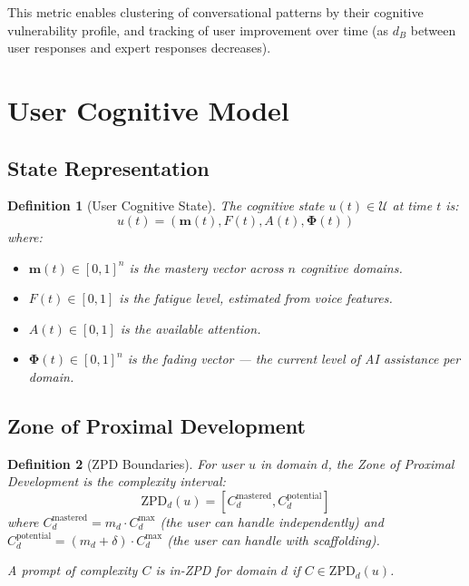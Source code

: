 \documentclass[12pt,a4paper]{article}
\newtheorem{definition}{Definition}[section]
\theoremstyle{remark}
\newcommand{\CU}{\mathcal{U}}
\begin{document}
This metric enables clustering of conversational patterns by their cognitive vulnerability profile, and tracking of user improvement over time (as $d_B$ between user responses and expert responses decreases).

\section{User Cognitive Model}

\subsection{State Representation}

\begin{definition}[User Cognitive State]
The cognitive state $u(t) \in \CU$ at time $t$ is:
\begin{equation}
u(t) = (\mathbf{m}(t), F(t), A(t), \mathbf{\Phi}(t))
\end{equation}
where:
\begin{itemize}
    \item $\mathbf{m}(t) \in [0,1]^n$ is the \emph{mastery vector} across $n$ cognitive domains.
    \item $F(t) \in [0,1]$ is the \emph{fatigue level}, estimated from voice features.
    \item $A(t) \in [0,1]$ is the \emph{available attention}.
    \item $\mathbf{\Phi}(t) \in [0,1]^n$ is the \emph{fading vector} — the current level of AI assistance per domain.
\end{itemize}
\end{definition}

\subsection{Zone of Proximal Development}

\begin{definition}[ZPD Boundaries]
For user $u$ in domain $d$, the Zone of Proximal Development is the complexity interval:
\begin{equation}
\text{ZPD}_d(u) = [C_d^{\text{mastered}}, C_d^{\text{potential}}]
\end{equation}
where $C_d^{\text{mastered}} = m_d \cdot C_d^{\max}$ (the user can handle independently) and $C_d^{\text{potential}} = (m_d + \delta) \cdot C_d^{\max}$ (the user can handle with scaffolding).

A prompt of complexity $C$ is \emph{in-ZPD} for domain $d$ if $C \in \text{ZPD}_d(u)$.
\end{definition}
\end{document}
